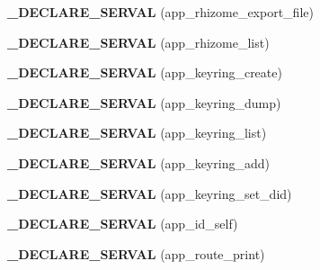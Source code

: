 \begin{DoxyCompactItemize}
\item 
\hypertarget{serval-client_8c_ae93fea8244ef72d3638c172646cfd535}{{\bfseries \+\_\+\+D\+E\+C\+L\+A\+R\+E\+\_\+\+S\+E\+R\+V\+A\+L} (app\+\_\+rhizome\+\_\+export\+\_\+file)}\label{serval-client_8c_ae93fea8244ef72d3638c172646cfd535}

\item 
\hypertarget{serval-client_8c_ad223a69e159212af44a2a2f5ed5ef784}{{\bfseries \+\_\+\+D\+E\+C\+L\+A\+R\+E\+\_\+\+S\+E\+R\+V\+A\+L} (app\+\_\+rhizome\+\_\+list)}\label{serval-client_8c_ad223a69e159212af44a2a2f5ed5ef784}

\item 
\hypertarget{serval-client_8c_ae6446b814403b74a80e829d8692c59e7}{{\bfseries \+\_\+\+D\+E\+C\+L\+A\+R\+E\+\_\+\+S\+E\+R\+V\+A\+L} (app\+\_\+keyring\+\_\+create)}\label{serval-client_8c_ae6446b814403b74a80e829d8692c59e7}

\item 
\hypertarget{serval-client_8c_a519ceefd067ede53988a2bd1419d9a1b}{{\bfseries \+\_\+\+D\+E\+C\+L\+A\+R\+E\+\_\+\+S\+E\+R\+V\+A\+L} (app\+\_\+keyring\+\_\+dump)}\label{serval-client_8c_a519ceefd067ede53988a2bd1419d9a1b}

\item 
\hypertarget{serval-client_8c_a8394b1a564778fbc05fc185ae0bc31ce}{{\bfseries \+\_\+\+D\+E\+C\+L\+A\+R\+E\+\_\+\+S\+E\+R\+V\+A\+L} (app\+\_\+keyring\+\_\+list)}\label{serval-client_8c_a8394b1a564778fbc05fc185ae0bc31ce}

\item 
\hypertarget{serval-client_8c_a0fab286f8c4a70663d8fd78136cbb650}{{\bfseries \+\_\+\+D\+E\+C\+L\+A\+R\+E\+\_\+\+S\+E\+R\+V\+A\+L} (app\+\_\+keyring\+\_\+add)}\label{serval-client_8c_a0fab286f8c4a70663d8fd78136cbb650}

\item 
\hypertarget{serval-client_8c_aedd8f48d8b0c34b4842e636a18dd2f00}{{\bfseries \+\_\+\+D\+E\+C\+L\+A\+R\+E\+\_\+\+S\+E\+R\+V\+A\+L} (app\+\_\+keyring\+\_\+set\+\_\+did)}\label{serval-client_8c_aedd8f48d8b0c34b4842e636a18dd2f00}

\item 
\hypertarget{serval-client_8c_a84eb7919a46ffa0e56c4d5760b5d7e91}{{\bfseries \+\_\+\+D\+E\+C\+L\+A\+R\+E\+\_\+\+S\+E\+R\+V\+A\+L} (app\+\_\+id\+\_\+self)}\label{serval-client_8c_a84eb7919a46ffa0e56c4d5760b5d7e91}

\item 
\hypertarget{serval-client_8c_a8fb9656ad1b78e0bf980b06ff0d3692f}{{\bfseries \+\_\+\+D\+E\+C\+L\+A\+R\+E\+\_\+\+S\+E\+R\+V\+A\+L} (app\+\_\+route\+\_\+print)}\label{serval-client_8c_a8fb9656ad1b78e0bf980b06ff0d3692f}


\end{DoxyCompactItemize}
